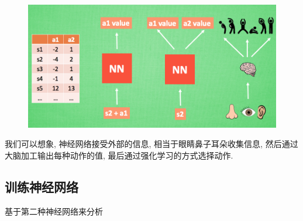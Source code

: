 \documentclass[UTF8,a4paper,12pt]{ctexbook}
\begin{document}
			\begin{figure}[H]
				\centering
				\includegraphics[width=.9\linewidth]{DQN2}
			\end{figure}
		
			我们可以想象, 神经网络接受外部的信息, 相当于眼睛鼻子耳朵收集信息, 然后通过大脑加工输出每种动作的值, 最后通过强化学习的方式选择动作.
			
		\subsection{训练神经网络}
			基于第二种神经网络来分析
			
\end{document}
